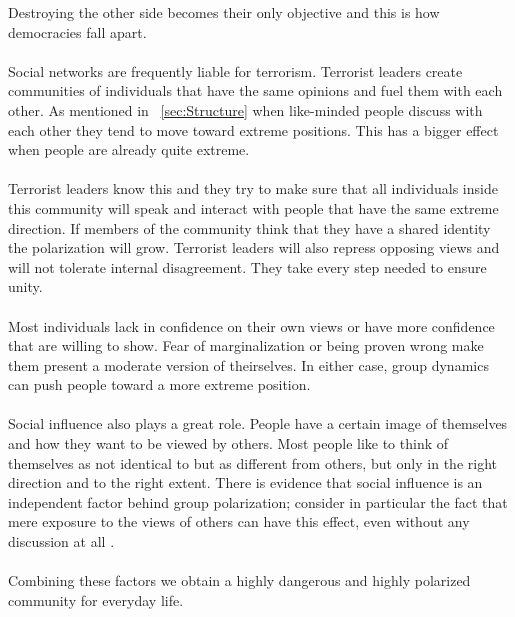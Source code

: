 Destroying the other side becomes their only objective and this is how democracies fall apart.
\\
\\
Social networks are frequently liable for terrorism. Terrorist leaders create communities of individuals that have the same opinions and fuel them with each other. As mentioned in ~\ref{sec:Structure}  when like-minded people discuss with each other they tend to move toward extreme positions. This has a bigger effect when people are already quite extreme. 
\\
\\
Terrorist leaders know this and they try to make sure that all individuals inside this community will speak and interact with people that have the same extreme direction. If members of the community think that they have a shared identity the polarization will grow. Terrorist leaders will also repress opposing views and will not tolerate internal disagreement. They take every step needed to ensure unity.
\\
\\
Most individuals lack in confidence on their own views or have more confidence that are willing to show. Fear of marginalization or being proven wrong make them present a moderate version of theirselves. In either case, group dynamics can push people toward a more extreme position.
\\
\\
Social influence also plays a great role. People have a certain image of themselves and how they want to be viewed by others. Most people like to think of themselves as not identical to but as different from others, but only in the right direction and to the right extent. There is evidence that social influence is an independent factor behind group polarization; consider in particular the fact that mere exposure to the views of others can have this effect, even without any discussion at all \cite{sunstein}.
\\
\\
Combining these factors we obtain a highly dangerous and highly polarized community for everyday life.


